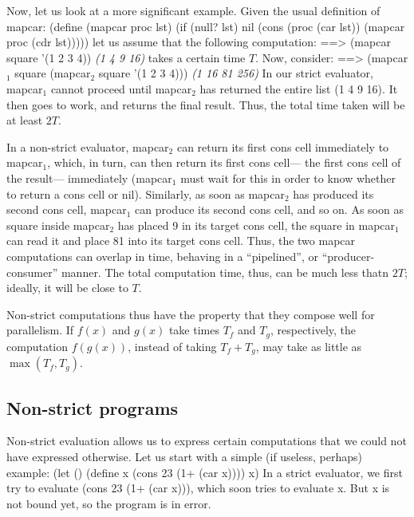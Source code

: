 Now, let us look at a more significant example.
Given the usual definition of {\cf mapcar}:
\beginlisp
(define (mapcar proc lst)
  (if (null? lst)
      nil
      (cons (proc (car lst))
            (mapcar proc (cdr lst)))))
\endlisp
let us assume that the following computation:
\beginlisp
==> (mapcar square '(1 2 3 4))
\null
{\em (1 4 9 16)}
\endlisp
takes a certain time $T$.  Now, consider:
\beginlisp
==> (mapcar$_1$ square (mapcar$_2$ square '(1 2 3 4)))
\null
{\em (1 16 81 256)}
\endlisp
 In our strict evaluator, {\cf mapcar$_1$} cannot proceed until {\cf
mapcar$_2$} has returned the entire list {\cf (1 4 9 16)}.  It then goes to
work, and returns the final result.  Thus, the total time taken will be at least
$2T$. 

In a non-strict evaluator, {\cf mapcar$_2$} can return its first cons
cell immediately to {\cf mapcar$_1$}, which, in turn, can then return
its first cons cell--- the first cons cell of the result---
immediately ({\cf mapcar$_1$} must wait for this in order to know
whether to return a cons cell or {\cf nil}). Similarly, as soon as
{\cf mapcar$_2$} has produced its second cons cell, {\cf mapcar$_1$}
can produce its second cons cell, and so on.  As soon as {\cf square}
inside {\cf mapcar$_2$} has placed 9 in its target cons cell, the {\cf
square} in {\cf mapcar$_1$} can read it and place 81 into its target
cons cell.  Thus, the two {\cf mapcar} computations can overlap in
time, behaving in a ``pipelined'', or ``producer-consumer'' manner.
The total computation time, thus, can be much less thatn $2T$;
ideally, it will be close to $T$.

Non-strict computations thus have the property that they compose well
for parallelism.  If $f(x)$ and $g(x)$ take times $T_f$ and $T_g$,
respectively, the computation $f(g(x))$, instead of taking $T_f+T_g$,
may take as little as $\max (T_f,T_g)$.

\subsection{Non-strict programs}

\label{normal-order-connection}

Non-strict evaluation allows us to express certain computations that we could
not have expressed otherwise.  Let us start with a simple (if useless,
perhaps) example:
\beginlisp
(let ()
  (define x (cons 23 (1+ (car x))))
  x)
\endlisp
In a strict evaluator, we first try to evaluate {\cf (cons 23 (1+ (car x)))},
which soon tries to evaluate {\cf x}.  But {\cf x} is not bound yet, so the
program is in error.

